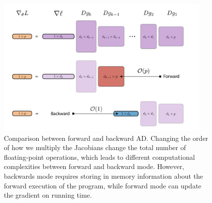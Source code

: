 \begin{figure}[t]
    \centering
    \includegraphics[width=0.95\textwidth]{figures/VJP-JVP.png}
    \caption{Comparison between forward and backward AD. Changing the order of how we multiply the Jacobians change the total number of floating-point operations, which leads to different computational complexities between forward and backward mode. However, backwards mode requires storing in memory information about the forward execution of the program, while forward mode can update the gradient on running time.}
    \label{fig:vjp-jvp}
\end{figure}
